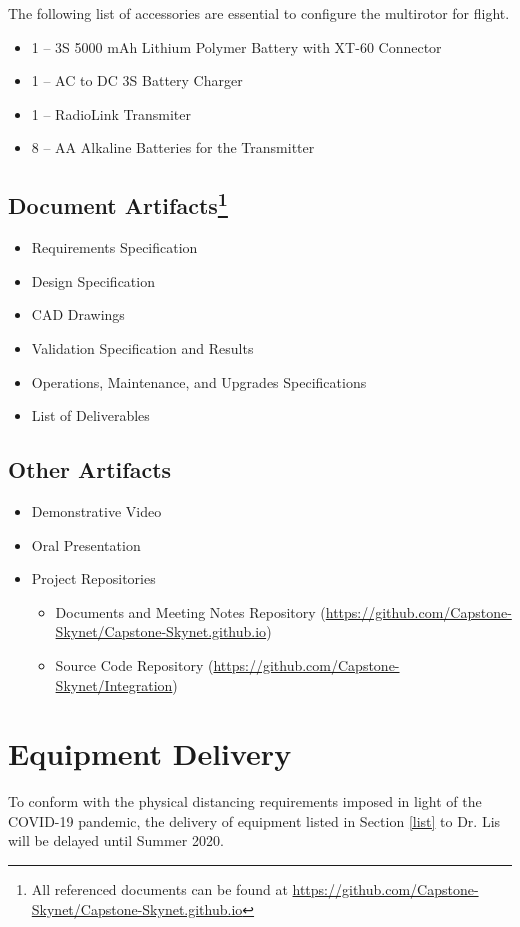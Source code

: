 \documentclass[10pt,letterpaper]{article}
\begin{document}
The following list of accessories are essential to configure the multirotor for flight.

\begin{itemize}
\item 1 -- 3S 5000 mAh Lithium Polymer Battery with XT-60 Connector
\item 1 -- AC to DC 3S Battery Charger
\item 1 -- RadioLink Transmiter
\item 8 -- AA Alkaline Batteries for the Transmitter
\end{itemize}


\subsection[Document Artifacts]{Document Artifacts\footnote{All referenced documents can be found at \url{https://github.com/Capstone-Skynet/Capstone-Skynet.github.io}}}

\begin{itemize}
\item Requirements Specification
\item Design Specification
\item CAD Drawings
\item Validation Specification and Results
\item Operations, Maintenance, and Upgrades Specifications
\item List of Deliverables
\end{itemize}

\subsection{Other Artifacts}
\begin{itemize}
\item Demonstrative Video
\item Oral Presentation
\item Project Repositories
\begin{itemize}
    \item Documents and Meeting Notes Repository ({\url{https://github.com/Capstone-Skynet/Capstone-Skynet.github.io}})
    \item Source Code Repository ({\url{https://github.com/Capstone-Skynet/Integration}})
\end{itemize}
\end{itemize}

\section{Equipment Delivery}
To conform with the physical distancing requirements imposed in light of the COVID-19 pandemic, the delivery of equipment listed in Section \ref{list} to Dr. Lis will be delayed until Summer 2020. 
\end{document}
